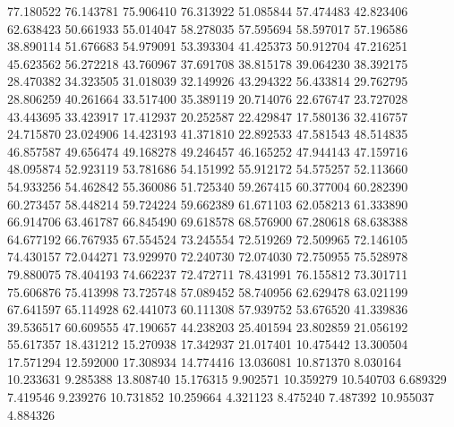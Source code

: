 77.180522
76.143781
75.906410
76.313922
51.085844
57.474483
42.823406
62.638423
50.661933
55.014047
58.278035
57.595694
58.597017
57.196586
38.890114
51.676683
54.979091
53.393304
41.425373
50.912704
47.216251
45.623562
56.272218
43.760967
37.691708
38.815178
39.064230
38.392175
28.470382
34.323505
31.018039
32.149926
43.294322
56.433814
29.762795
28.806259
40.261664
33.517400
35.389119
20.714076
22.676747
23.727028
43.443695
33.423917
17.412937
20.252587
22.429847
17.580136
32.416757
24.715870
23.024906
14.423193
41.371810
22.892533
47.581543
48.514835
46.857587
49.656474
49.168278
49.246457
46.165252
47.944143
47.159716
48.095874
52.923119
53.781686
54.151992
55.912172
54.575257
52.113660
54.933256
54.462842
55.360086
51.725340
59.267415
60.377004
60.282390
60.273457
58.448214
59.724224
59.662389
61.671103
62.058213
61.333890
66.914706
63.461787
66.845490
69.618578
68.576900
67.280618
68.638388
64.677192
66.767935
67.554524
73.245554
72.519269
72.509965
72.146105
74.430157
72.044271
73.929970
72.240730
72.074030
72.750955
75.528978
79.880075
78.404193
74.662237
72.472711
78.431991
76.155812
73.301711
75.606876
75.413998
73.725748
57.089452
58.740956
62.629478
63.021199
67.641597
65.114928
62.441073
60.111308
57.939752
53.676520
41.339836
39.536517
60.609555
47.190657
44.238203
25.401594
23.802859
21.056192
55.617357
18.431212
15.270938
17.342937
21.017401
10.475442
13.300504
17.571294
12.592000
17.308934
14.774416
13.036081
10.871370
8.030164
10.233631
9.285388
13.808740
15.176315
9.902571
10.359279
10.540703
6.689329
7.419546
9.239276
10.731852
10.259664
4.321123
8.475240
7.487392
10.955037
4.884326

